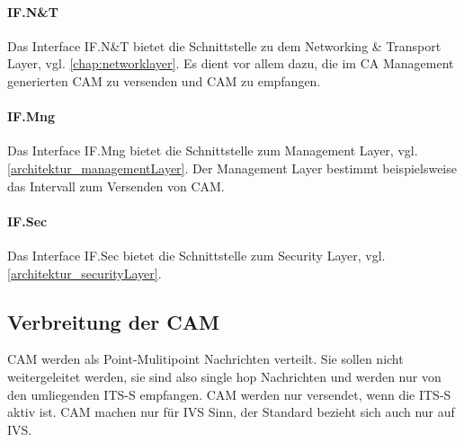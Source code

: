 \paragraph{IF.N\&T}
Das Interface IF.N\&T bietet die Schnittstelle zu dem Networking \& Transport Layer, vgl. \autoref{chap:networklayer}. Es dient vor allem dazu, die im \ac{CA} Management generierten \ac{CAM} zu versenden und \ac{CAM} zu empfangen. 

\paragraph{IF.Mng}
Das Interface IF.Mng bietet die Schnittstelle zum Management Layer, vgl. \ref{architektur_managementLayer}. Der Management Layer bestimmt beispielsweise das Intervall zum Versenden von \ac{CAM}.

\paragraph{IF.Sec}
Das Interface IF.Sec bietet die Schnittstelle zum Security Layer, vgl. \ref{architektur_securityLayer}.

\subsection{Verbreitung der CAM}
\ac{CAM} werden als Point-Mulitipoint Nachrichten verteilt. Sie sollen nicht weitergeleitet werden, sie sind also single hop Nachrichten und werden nur von den umliegenden \ac{ITS-S} empfangen. \ac{CAM} werden nur versendet, wenn die \ac{ITS-S} aktiv ist. \ac{CAM} machen nur für \ac{IVS} Sinn, der Standard \cite{en302637-2} bezieht sich auch nur auf \ac{IVS}. 

